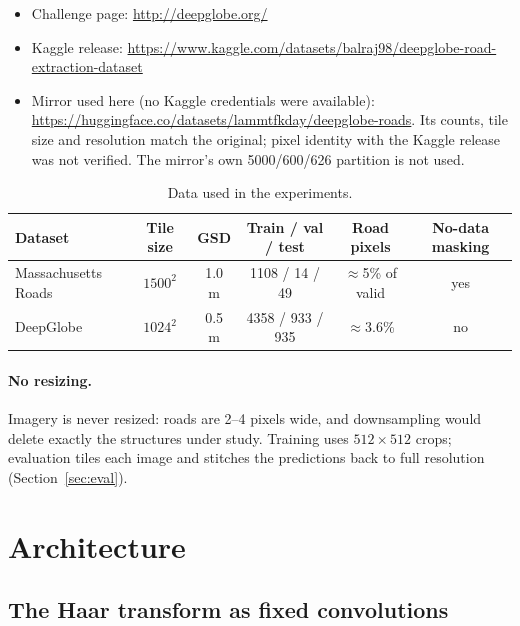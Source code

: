 \documentclass[11pt]{article}
\begin{document}
\begin{itemize}
  \item Challenge page: \url{http://deepglobe.org/}
  \item Kaggle release: \url{https://www.kaggle.com/datasets/balraj98/deepglobe-road-extraction-dataset}
  \item Mirror used here (no Kaggle credentials were available): \url{https://huggingface.co/datasets/lammtfkday/deepglobe-roads}.
        Its counts, tile size and resolution match the original; pixel identity with the Kaggle
        release was not verified. The mirror's own 5000/600/626 partition is not used.
\end{itemize}

\begin{table}[h]
\centering
\caption{Data used in the experiments.}
\begin{tabular}{@{}lccccc@{}}
\toprule
Dataset & Tile size & GSD & Train / val / test & Road pixels & No-data masking \\
\midrule
Massachusetts Roads & $1500^2$ & 1.0 m & 1108 / 14 / 49 & $\approx$5\% of valid & yes \\
DeepGlobe & $1024^2$ & 0.5 m & 4358 / 933 / 935 & $\approx$3.6\% & no \\
\bottomrule
\end{tabular}
\end{table}

\paragraph{No resizing.} Imagery is never resized: roads are 2--4 pixels wide, and downsampling
would delete exactly the structures under study. Training uses $512\times512$ crops; evaluation
tiles each image and stitches the predictions back to full resolution (Section~\ref{sec:eval}).

\section{Architecture}
\label{sec:arch}

\subsection{The Haar transform as fixed convolutions}
\end{document}
